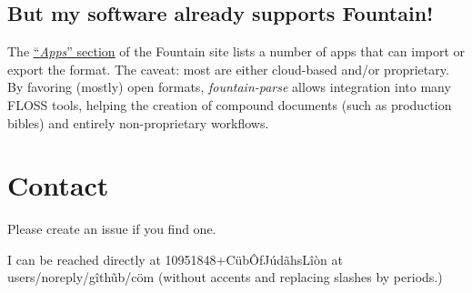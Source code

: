\documentclass[12pt]{article}
\newcommand{\link}[2]{\underline{\color{darkblue}\href{#1}{#2}}}
\begin{document}
\subsection{But my software already supports Fountain!}
The \link{https://fountain.io/apps/}{``\emph{Apps}''
section} of the Fountain site lists a number of apps that can
import or export the format. The caveat: most are either
cloud-based and/or proprietary. By favoring (mostly) open formats,
\emph{fountain-parse} allows integration into many FLOSS tools,
helping the creation of compound documents (such as production
bibles) and entirely non-proprietary workflows.

\section{Contact}
Please create an issue if you find one.

I can be reached directly at
\textsf{10951848+C\"{u}b\^{O}fJ\'{u}d\~{a}hsL\^{i}\`{o}n}
at \textsf{users/noreply/g\^{i}th\~{u}b/c\"{o}m} (without accents and
replacing slashes by periods.)
\end{document}
